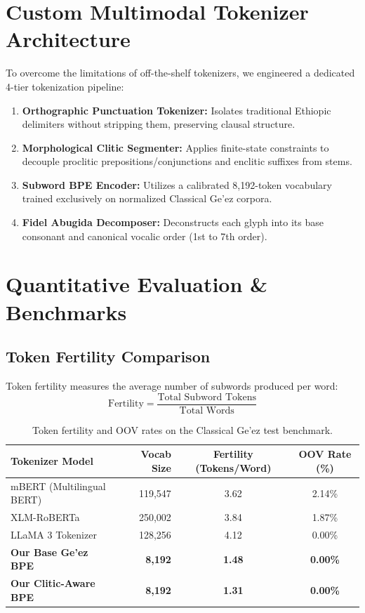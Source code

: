 \documentclass[11pt,a4paper]{article}
\begin{document}
\section{Custom Multimodal Tokenizer Architecture}
To overcome the limitations of off-the-shelf tokenizers, we engineered a dedicated 4-tier tokenization pipeline:
\begin{enumerate}
    \item \textbf{Orthographic Punctuation Tokenizer:} Isolates traditional Ethiopic delimiters without stripping them, preserving clausal structure.
    \item \textbf{Morphological Clitic Segmenter:} Applies finite-state constraints to decouple proclitic prepositions/conjunctions and enclitic suffixes from stems.
    \item \textbf{Subword BPE Encoder:} Utilizes a calibrated 8,192-token vocabulary trained exclusively on normalized Classical Ge'ez corpora.
    \item \textbf{Fidel Abugida Decomposer:} Deconstructs each glyph into its base consonant and canonical vocalic order (1st to 7th order).
\end{enumerate}

\section{Quantitative Evaluation \& Benchmarks}
\subsection{Token Fertility Comparison}
Token fertility measures the average number of subwords produced per word:
\begin{equation}
\text{Fertility} = \frac{\text{Total Subword Tokens}}{\text{Total Words}}
\end{equation}

\begin{table}[h]
\centering
\small
\begin{tabular}{lrcc}
\toprule
\textbf{Tokenizer Model} & \textbf{Vocab Size} & \textbf{Fertility (Tokens/Word)} & \textbf{OOV Rate (\%)} \\
\midrule
mBERT (Multilingual BERT) & 119,547 & 3.62 & 2.14\% \\
XLM-RoBERTa               & 250,002 & 3.84 & 1.87\% \\
LLaMA 3 Tokenizer         & 128,256 & 4.12 & 0.00\% \\
\textbf{Our Base Ge'ez BPE} & \textbf{8,192} & \textbf{1.48} & \textbf{0.00\%} \\
\textbf{Our Clitic-Aware BPE} & \textbf{8,192} & \textbf{1.31} & \textbf{0.00\%} \\
\bottomrule
\end{tabular}
\caption{Token fertility and OOV rates on the Classical Ge'ez test benchmark.}
\label{tab:fertility}
\end{table}
\end{document}
